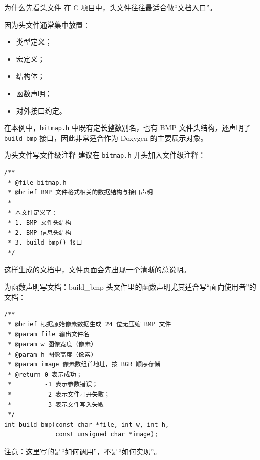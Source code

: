 \documentclass[aspectratio=169,11pt]{beamer}
\begin{document}
\begin{frame}{为什么先看头文件}
在 C 项目中，头文件往往最适合做“文档入口”。

因为头文件通常集中放置：
\begin{itemize}
  \item 类型定义；
  \item 宏定义；
  \item 结构体；
  \item 函数声明；
  \item 对外接口约定。
\end{itemize}

\vspace{0.5em}
在本例中，\texttt{bitmap.h} 中既有定长整数别名，也有 BMP 文件头结构，还声明了 \texttt{build\_bmp} 接口，因此非常适合作为 Doxygen 的主要展示对象。
\end{frame}

\begin{frame}[fragile]{为头文件写文件级注释}
建议在 \texttt{bitmap.h} 开头加入文件级注释：

\begin{lstlisting}
/**
 * @file bitmap.h
 * @brief BMP 文件格式相关的数据结构与接口声明
 *
 * 本文件定义了：
 * 1. BMP 文件头结构
 * 2. BMP 信息头结构
 * 3. build_bmp() 接口
 */
\end{lstlisting}

这样生成的文档中，文件页面会先出现一个清晰的总说明。
\end{frame}


\begin{frame}[fragile]{为函数声明写文档：build\_bmp}
头文件里的函数声明尤其适合写“面向使用者”的文档：

\begin{lstlisting}
/**
 * @brief 根据原始像素数据生成 24 位无压缩 BMP 文件
 * @param file 输出文件名
 * @param w 图像宽度（像素）
 * @param h 图像高度（像素）
 * @param image 像素数组首地址，按 BGR 顺序存储
 * @return 0 表示成功；
 *         -1 表示参数错误；
 *         -2 表示文件打开失败；
 *         -3 表示文件写入失败
 */
int build_bmp(const char *file, int w, int h,
              const unsigned char *image);
\end{lstlisting}

注意：这里写的是“如何调用”，不是“如何实现”。
\end{frame}
\end{document}
